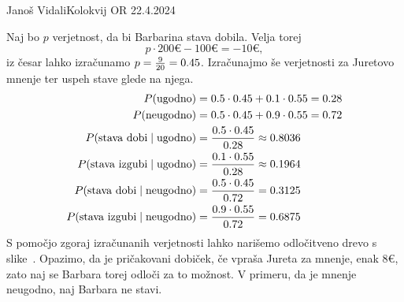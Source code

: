 \begin{naloga}{Janoš Vidali}{Kolokvij OR 22.4.2024}
\begin{odgovor}
Naj bo $p$ verjetnost, da bi Barbarina stava dobila.
Velja torej
$$
p \cdot 200 € - 100 € = -10 €,
$$
iz česar lahko izračunamo $p = {9 \over 20} = 0.45$.
Izračunajmo še verjetnosti za Juretovo mnenje
ter uspeh stave glede na njega.
\begin{align*}
P(\text{ugodno}) &= 0.5 \cdot 0.45 + 0.1 \cdot 0.55 = 0.28 \\
P(\text{neugodno}) &= 0.5 \cdot 0.45 + 0.9 \cdot 0.55 = 0.72 \\
P(\text{stava dobi} \mid \text{ugodno})
&= {0.5 \cdot 0.45 \over 0.28} \approx 0.8036 \\
P(\text{stava izgubi} \mid \text{ugodno})
&= {0.1 \cdot 0.55 \over 0.28} \approx 0.1964 \\
P(\text{stava dobi} \mid \text{neugodno})
&= {0.5 \cdot 0.45 \over 0.72} = 0.3125 \\
P(\text{stava izgubi} \mid \text{neugodno})
&= {0.9 \cdot 0.55 \over 0.72} = 0.6875
\end{align*}
S pomočjo zgoraj izračunanih verjetnosti
lahko narišemo odločitveno drevo s slike~\fig.
Opazimo,
da je pričakovani dobiček, če vpraša Jureta za mnenje, enak $8 €$,
zato naj se Barbara torej odloči za to možnost.
V primeru, da je mnenje neugodno, naj Barbara ne stavi.

\begin{slika}
\makebox[\textwidth][c]{
\pgfslika
}
\end{slika}\end{odgovor}
\end{naloga}
